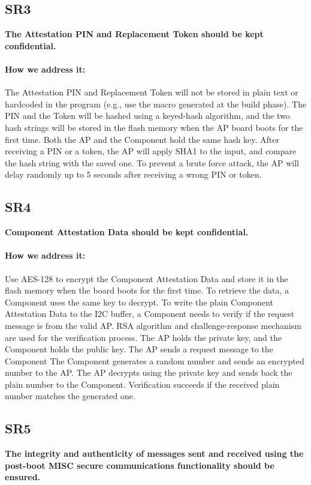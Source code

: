 \documentclass[11pt,oneside,onecolumn,letterpaper]{article}
\newcounter{alg}
\begin{document}
	\subsection{SR3}
	\textbf{The Attestation PIN and Replacement Token should be kept confidential.}
	\paragraph{How we address it:}
	The Attestation PIN and Replacement Token will not be stored in plain text or hardcoded in the program (e.g., use the macro generated at the build phase).
	The PIN and the Token will be hashed using a keyed-hash algorithm,
	and the two hash strings will be stored in the flash memory when the AP board boots for the first time.
	Both the AP and the Component hold the same hash key.
	After receiving a PIN or a token,
	the AP will apply SHA1 to the input,
	and compare the hash string with the saved one.
	To prevent a brute force attack,
	the AP will delay randomly up to 5 seconds after receiving a wrong PIN or token.
	
	\subsection{SR4}
	\textbf{Component Attestation Data should be kept confidential.}
	\paragraph{How we address it:}
	Use AES-128 to encrypt the Component Attestation Data and store it in the flash memory when the board boots for the first time.
	To retrieve the data,
	a Component uses the same key to decrypt.
	To write the plain Component Attestation Data to the I2C buffer,
	a Component needs to verify if the request message is from the valid AP.
	RSA algorithm and challenge-response mechanism are used for the verification process.
	The AP holds the private key,
	and the Component holds the public key.
	The AP sends a request message to the Component
	The Component generates a random number and sends an encrypted number to the AP.
	The AP decrypts using the private key and sends back the plain number to the Component.
	Verification succeeds if the received plain number matches the generated one.
	
	\subsection{SR5}
	\textbf{The integrity and authenticity of messages sent and received using the post-boot MISC secure communications functionality should be ensured.}
\end{document}
